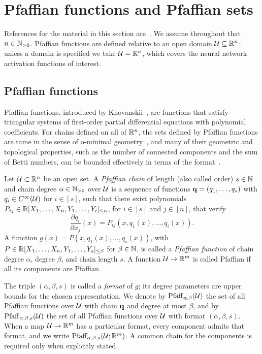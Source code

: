 \section{Pfaffian functions and Pfaffian sets}\label{sec:pfaffian}
References for the material in this section are~\cite{khovanskii1991fewnomials, zell2003quantitative, gabrielov2004complexity}. We assume throughout that $n\in \mathbb{N}_{>0}$. Pfaffian functions are defined relative to an open domain $\mathcal{U}\subseteq\mathbb{R}^n$; unless a domain is specified we take $\mathcal{U}=\mathbb{R}^n$, which covers the neural network activation functions of interest.

\subsection{Pfaffian functions}
Pfaffian functions, introduced by Khovanskii~\cite{khovanskii1991fewnomials}, are functions that satisfy triangular systems of first-order partial differential equations with polynomial coefficients. For chains defined on all of $\mathbb{R}^n$, the sets defined by Pfaffian functions are tame in the sense of o-minimal geometry~\cite{wilkie1996model, wilkie1999theorem, speissegger1999pfaffian}, and many of their geometric and topological properties, such as the number of connected components and the sum of Betti numbers, can be bounded effectively in terms of the format~\cite{gabrielov2004complexity}.

\begin{definition}
Let $\mathcal{U} \subset \mathbb{R}^n$ be an open set. A \emph{Pfaffian chain} of length (also called order) $s \in \mathbb{N}$ and chain degree $\alpha \in \mathbb{N}_{>0}$ over $\mathcal{U}$ is a sequence of functions $\mathbf{q}= (q_1, \dotsc, q_s)$ with $q_i\in C^\infty(\mathcal{U})$ for $i\in [s]$, such that there exist polynomials $P_{ij}\in \mathbb{R}[X_1,\dots,X_n,Y_1,\dots,Y_i]_{\leq \alpha}$, for $i\in [s]$ and $j\in [n]$, that verify
\begin{equation}\label{eq:pfaffchain}
\frac{\partial q_i}{\partial x_j}(x) = P_{ij}(x, q_1(x), \dotsc, q_i(x)).
\end{equation}
A function $g(x)=P(x,q_1(x),\dots,q_s(x))$, with $P\in \mathbb{R}[X_1,\dots,X_n,Y_1,\dots,Y_s]_{\leq \beta}$ for $\beta\in \mathbb{N}$, is called a \emph{Pfaffian function} of chain degree $\alpha$, degree $\beta$, and chain length $s$. A function $\mathcal{U}\to \mathbb{R}^m$ is called Pfaffian if all its components are Pfaffian.
\end{definition}

The triple $(\alpha, \beta, s)$ is called a \emph{format} of $g$; its degree parameters are upper bounds for the chosen representation. We denote by $\mathrm{Pfaff}_{\mathbf{q},\beta}(\mathcal{U})$ the set of all Pfaffian functions over $\mathcal{U}$ with chain $\mathbf{q}$ and degree at most $\beta$, and by $\mathrm{Pfaff}_{\alpha,\beta,s}(\mathcal{U})$ the set of all Pfaffian functions over $\mathcal{U}$ with format $(\alpha,\beta,s)$. When a map $\mathcal{U}\to \mathbb{R}^m$ has a particular format, every component admits that format, and we write $\mathrm{Pfaff}_{\alpha,\beta,s}(\mathcal{U}; \mathbb{R}^m)$. A common chain for the components is required only when explicitly stated.

